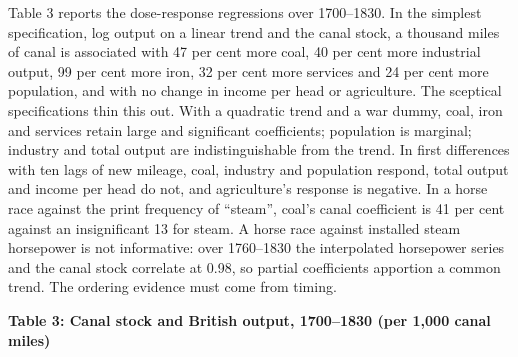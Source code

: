 \documentclass[
  11pt,
]{article}
\begin{document}
Table 3 reports the dose-response regressions over 1700--1830. In the
simplest specification, log output on a linear trend and the canal
stock, a thousand miles of canal is associated with 47 per cent more
coal, 40 per cent more industrial output, 99 per cent more iron, 32 per
cent more services and 24 per cent more population, and with no change
in income per head or agriculture. The sceptical specifications thin
this out. With a quadratic trend and a war dummy, coal, iron and
services retain large and significant coefficients; population is
marginal; industry and total output are indistinguishable from the
trend. In first differences with ten lags of new mileage, coal, industry
and population respond, total output and income per head do not, and
agriculture's response is negative. In a horse race against the print
frequency of ``steam'', coal's canal coefficient is 41 per cent against
an insignificant 13 for steam. A horse race against installed steam
horsepower is not informative: over 1760--1830 the interpolated
horsepower series and the canal stock correlate at 0.98, so partial
coefficients apportion a common trend. The ordering evidence must come
from timing.

\textbf{Table 3: Canal stock and British output, 1700--1830 (per 1,000
canal miles)}
\end{document}
